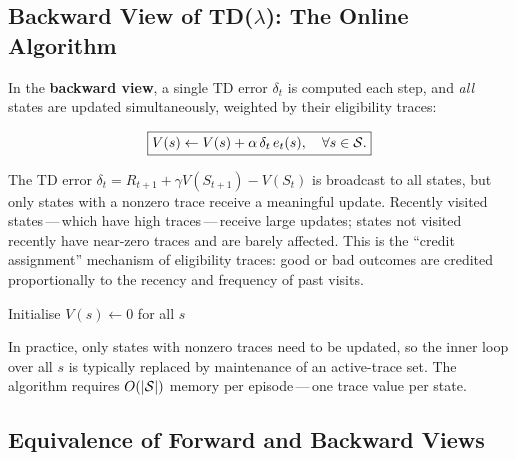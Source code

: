 \subsection{Backward View of TD($\lambda$): The Online Algorithm}
\label{subsec:backward-view}

In the \textbf{backward view}, a single TD error $\delta_t$ is computed each step, and \emph{all} states are updated simultaneously, weighted by their eligibility traces:

\begin{equation}
\label{eq:td-lambda-update}
\boxed{V(s) \leftarrow V(s) + \alpha\,\delta_t\,e_t(s), \quad \forall s\in\mathcal{S}.}
\end{equation}

The TD error $\delta_t = R_{t+1}+\gamma V(S_{t+1})-V(S_t)$ is broadcast to all states, but only states with a nonzero trace receive a meaningful update.  Recently visited states\,---\,which have high traces\,---\,receive large updates; states not visited recently have near-zero traces and are barely affected.  This is the ``credit assignment'' mechanism of eligibility traces: good or bad outcomes are credited proportionally to the recency and frequency of past visits.

\begin{algorithm}[ht]
\caption{TD($\lambda$) with Eligibility Traces}
\label{alg:td-lambda}
Initialise $V(s)\leftarrow 0$ for all $s$\;
\end{algorithm}

In practice, only states with nonzero traces need to be updated, so the inner loop over all $s$ is typically replaced by maintenance of an active-trace set.  The algorithm requires $O(|\mathcal{S}|)$ memory per episode\,---\,one trace value per state.

\subsection{Equivalence of Forward and Backward Views}

